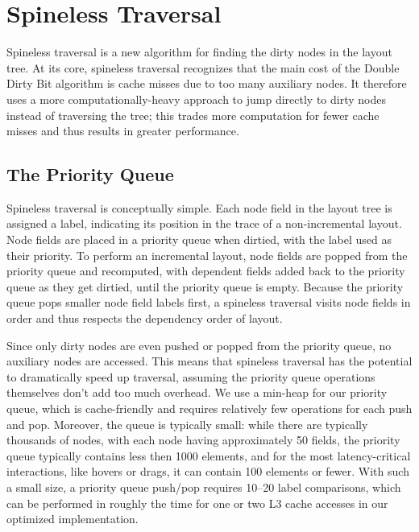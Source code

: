 \section{Spineless Traversal}

Spineless traversal is a new algorithm
  for finding the dirty nodes in the layout tree.
At its core, spineless traversal recognizes
  that the main cost of the Double Dirty Bit algorithm
  is cache misses due to too many auxiliary nodes.
It therefore uses a more computationally-heavy approach
  to jump directly to dirty nodes instead of traversing the tree;
  this trades more computation for fewer cache misses
  and thus results in greater performance.

\subsection{The Priority Queue}

Spineless traversal is conceptually simple.
Each node field in the layout tree is assigned a label,
  indicating its position in the trace of a non-incremental layout.
Node fields are placed in a priority queue when dirtied,
  with the label used as their priority.
To perform an incremental layout,
  node fields are popped from the priority queue and recomputed,
  with dependent fields
  added back to the priority queue as they get dirtied,
  until the priority queue is empty.
Because the priority queue pops smaller node field labels first,
  a spineless traversal visits node fields in order
  and thus respects the dependency order of layout.

Since only dirty nodes are even pushed or popped from the priority queue,
  no auxiliary nodes are accessed.
This means that spineless traversal has the potential
  to dramatically speed up traversal,
  assuming the priority queue operations themselves
  don't add too much overhead.
We use a min-heap for our priority queue,
  which is cache-friendly and requires relatively few operations
  for each push and pop.
Moreover, the queue is typically small:
  while there are typically thousands of nodes,
  with each node having approximately 50 fields,
  the priority queue typically contains less then 1000 elements,
  and for the most latency-critical interactions,
  like hovers or drags, it can contain 100 elements or fewer.
With such a small size, a priority queue push/pop requires
  10--20 label comparisons,
  which can be performed in roughly the time
  for one or two L3 cache accesses
  in our optimized implementation.


